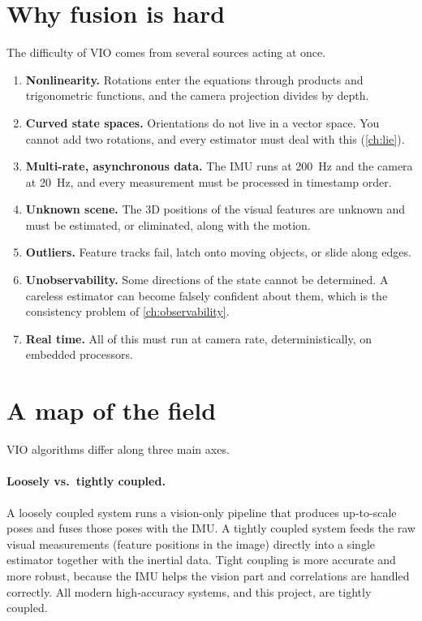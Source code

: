 \section{Why fusion is hard}

The difficulty of VIO comes from several sources acting at once.
\begin{enumerate}
  \item \textbf{Nonlinearity.} Rotations enter the equations through products and trigonometric
        functions, and the camera projection divides by depth.
  \item \textbf{Curved state spaces.} Orientations do not live in a vector space. You cannot add
        two rotations, and every estimator must deal with this (\cref{ch:lie}).
  \item \textbf{Multi-rate, asynchronous data.} The IMU runs at 200~Hz and the camera at 20~Hz,
        and every measurement must be processed in timestamp order.
  \item \textbf{Unknown scene.} The 3D positions of the visual features are unknown and must be
        estimated, or eliminated, along with the motion.
  \item \textbf{Outliers.} Feature tracks fail, latch onto moving objects, or slide along edges.
  \item \textbf{Unobservability.} Some directions of the state cannot be determined. A careless
        estimator can become falsely confident about them, which is the consistency problem of
        \cref{ch:observability}.
  \item \textbf{Real time.} All of this must run at camera rate, deterministically, on embedded
        processors.
\end{enumerate}

\section{A map of the field}

VIO algorithms differ along three main axes.

\paragraph{Loosely vs.\ tightly coupled.} A loosely coupled system runs a vision-only pipeline
that produces up-to-scale poses and fuses those poses with the IMU. A tightly coupled system feeds
the raw visual measurements (feature positions in the image) directly into a single estimator
together with the inertial data. Tight coupling is more accurate and more robust, because the IMU
helps the vision part and correlations are handled correctly. All modern high-accuracy systems,
and this project, are tightly coupled.

